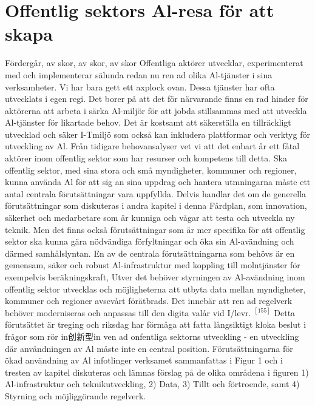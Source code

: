 {{{{{{{{\section*{Offentlig sektors Al-resa för att skapa}
Fördergår, av skor, av skor, av skor
Offentliga aktörer utvecklar, experimenterat med och implementerar sälunda redan nu ren ad olika Al-tjänster i sina verksamheter. Vi har bara gett ett axplock ovan. Dessa tjänster har ofta utvecklats i egen regi. Det borer på att det för närvarande finns en rad hinder för aktörerna att arbeta i särka Al-miljör för att jobda stillsammas med att utveckla Al-tjänster för likartade behov. Det är kostsamt att säkerställa en tillräckligt utvecklad och säker I-Tmiljö som också kan inkludera plattformar och verktyg för utveckling av Al.
Från tidigare behovansalyser vet vi att det enbart år ett fåtal aktörer inom offentlig sektor som har resurser och kompetens till detta.
Ska offentlig sektor, med sina stora och små myndigheter, kommuner och regioner, kunna använda Al för att sig an sina uppdrag och hantera utmningarna måste ett antal centrala förutsättningar vara uppfyllda. Delvis handlar det om de generella förutsättningar som diskuteras i andra kapitel i denna Fårdplan, som innovation, säkerhet och medarbetare som är kunniga och vågar att testa och utveckla ny teknik. Men det finns också förutsättningar som är mer specifika för att offentlig sektor ska kunna gära nödvändiga förfyltningar och öka sin Al-avändning och därmed samhålslyntan.
En av de centrala förutsättningarna som behövs är en gemensam, säker och robust Al-infrastruktur med koppling till molntjänster för exempelvis beräkningskraft, Utver det behöver styrningen av Al-avändning inom offentlig sektor utvecklas och möjligheterna att utbyta data mellan myndigheter, kommuner och regioner avsevårt förätbrads. Det innebär att ren ad regelverk behöver moderniseras och anpassas till den digita valår vid I/levr. \({ }^{[155]}\) Detta förutsättet är treging och riksdag har förmåga att fatta långsiktigt kloka beslut i frågor som rör in创新型in ven ad onfentliga sektorns utveckling - en utveckling där användningen av Al måste inte en central position.
Förutsättningarna för ökad användning av Al infotlinger verksamet sammanfattas i Figur 1 och i tresten av kapitel diskuteras och lämnas förslag på de olika områdena i figuren 1) Al-infrastruktur och teknikutveckling, 2) Data, 3) Tillt och förtroende, samt 4) Styrning och möjliggörande regelverk.

}}}}}}}}
